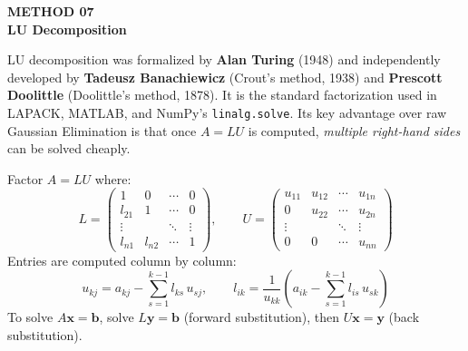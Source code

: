 \documentclass[12pt]{article}
\begin{document}
\newpage


\begin{tcolorbox}[
  enhanced, arc=0pt, boxrule=0pt,
  colback=primary, colframe=primary,
  left=16pt, right=16pt, top=14pt, bottom=10pt,
  borderline south={4pt}{0pt}{accent},
]
  {\color{accent!70}\small\bfseries METHOD 07}\\[4pt]
  {\LARGE\bfseries\color{white} LU Decomposition}
\end{tcolorbox}

\vspace{10pt}

\begin{histbox}
LU decomposition was formalized by \textbf{Alan Turing} (1948) and independently developed by \textbf{Tadeusz Banachiewicz} (Crout's method, 1938) and \textbf{Prescott Doolittle} (Doolittle's method, 1878). It is the standard factorization used in LAPACK, MATLAB, and NumPy's \texttt{linalg.solve}. Its key advantage over raw Gaussian Elimination is that once $A = LU$ is computed, \textit{multiple right-hand sides} can be solved cheaply.
\end{histbox}

\bigskip

\begin{defbox}
Factor $A = LU$ where:
\[
  L = \begin{pmatrix}1 & 0 & \cdots & 0\\ l_{21} & 1 & \cdots & 0\\ \vdots & & \ddots & \vdots\\ l_{n1} & l_{n2} & \cdots & 1\end{pmatrix},
  \qquad
  U = \begin{pmatrix}u_{11} & u_{12} & \cdots & u_{1n}\\ 0 & u_{22} & \cdots & u_{2n}\\ \vdots & & \ddots & \vdots\\ 0 & 0 & \cdots & u_{nn}\end{pmatrix}
\]
Entries are computed column by column:
\[
  u_{kj} = a_{kj} - \sum_{s=1}^{k-1} l_{ks}\,u_{sj}, \qquad
  l_{ik} = \frac{1}{u_{kk}}\!\left(a_{ik} - \sum_{s=1}^{k-1} l_{is}\,u_{sk}\right)
\]
To solve $A\mathbf{x}=\mathbf{b}$, solve $L\mathbf{y}=\mathbf{b}$ (forward substitution), then $U\mathbf{x}=\mathbf{y}$ (back substitution).
\end{defbox}
\end{document}
